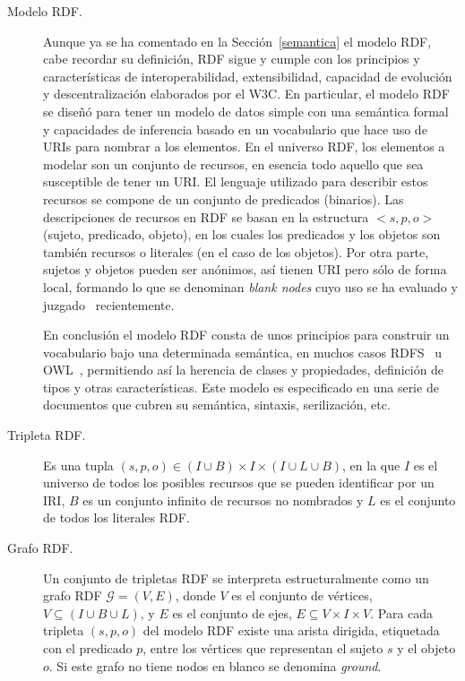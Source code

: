 \begin{description}
\item [Modelo RDF.] Aunque ya se ha comentado en la Sección~\ref{semantica} el modelo RDF, cabe recordar su definición, RDF
sigue y cumple con los principios y características de interoperabilidad, extensibilidad, capacidad de evolución
y descentralización elaborados por el \gls{W3C}. En particular, el modelo RDF se diseñó para tener un modelo de datos
simple con una semántica formal y capacidades de inferencia basado en un vocabulario que hace uso de URIs para nombrar
a los elementos. En el universo RDF, los elementos a modelar son un conjunto de recursos, en esencia todo
aquello que sea susceptible de tener un URI. El lenguaje utilizado para describir estos recursos se compone
de un conjunto de predicados (binarios). Las descripciones de recursos en RDF se basan en la estructura
$<s,p,o>$ (sujeto, predicado, objeto), en los cuales los predicados y los objetos son también recursos o 
literales (en el caso de los objetos). Por otra parte, sujetos y objetos pueden ser anónimos, así tienen URI
pero sólo de forma local, formando lo que se denominan \textit{blank nodes} cuyo uso se ha evaluado y juzgado~\cite{DBLP:conf/semweb/MalleaAHP11} 
recientemente.

En conclusión el modelo RDF consta de unos principios para construir un vocabulario 
bajo una determinada semántica, en muchos casos RDFS~\cite{RDFS} u \gls{OWL}~\cite{owl2-primer}, permitiendo así la herencia
de clases y propiedades, definición de tipos y otras características. Este modelo
es especificado en una serie de documentos que cubren su semántica, sintaxis, serilización, etc.

\item [Tripleta RDF.] Es una tupla $(s,p,o) \in (I \cup B) \times I \times 
(I \cup L \cup B)$, en la que $I$ es el universo de todos los posibles recursos que se pueden identificar
por un IRI, $B$ es un conjunto infinito de recursos no nombrados y $L$ es el conjunto
de todos los literales RDF.

\item [Grafo RDF.] Un conjunto de tripletas RDF se interpreta estructuralmente como un grafo
RDF $\mathcal{G} =(V,E)$, donde $V$ es el conjunto de vértices, $V \subseteq (I \cup B \cup L)$,
y $E$ es el conjunto de ejes, $E \subseteq V \times I \times 
V$. Para cada tripleta $(s,p,o)$ del modelo RDF existe
una arista dirigida, etiquetada con el predicado $p$, entre los vértices que representan el sujeto $s$ y el objeto $o$. Si este
grafo no tiene nodos en blanco se denomina \textit{ground}.


\end{description}
